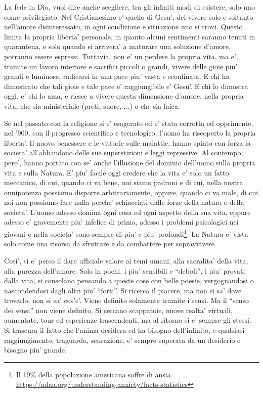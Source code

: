 La fede in Dio, vuol dire anche scegliere, tra gli infiniti modi di esistere, solo uno come privilegiato. Nel Cristianesimo e' quello di Gesu', del vivere solo e soltanto nell'amore disinteressato, in ogni condizione e situazione uno si trovi. Questo limita la propria liberta' personale, in quanto alcuni sentimenti saranno tenuti in quarantena, e solo quando si arrivera' a maturare una soluzione d'amore, potranno essere espressi. Tuttavia, non e' un perdere la propria vita, ma e', tramite un lavoro interiore e sacrifici piccoli o grandi, vivere delle gioie piu' grandi e luminose, radicarsi in una pace piu' vasta e sconfinata. E chi ha dimostrato che tali gioie e tale pace e' raggiungibile e' Gesu'. E chi lo dimostra oggi, e' chi lo ama, e riesce a vivere questa dimensione d'amore, nella propria vita, che sia ministeriale (preti, suore, ...) o che sia laica.

Se nel passato con la religione si e' esagerato ed e' stata corrotta ed opprimente, nel '900, con il progresso scientifico e tecnologico, l'uomo ha riscoperto la propria liberta'. Il nuovo benessere e le vittorie sulle malattie, hanno spinto con forza la societa' all'abbandono delle sue superstizioni e leggi repressive. Al contempo, pero', hanno portato con se' anche l'illusione del dominio dell'uomo sulla propria vita e sulla Natura. E' piu' facile oggi credere che la vita e' solo un fatto meccanico, di cui, quando ci va bene, noi siamo padroni e di cui, nella nostra onnipotenza possiamo disporre arbitrariamente, oppure, quando ci va male, di cui noi non possiamo fare nulla perche' schiacciati dalle forze della natura e della societa'. L'uomo adesso domina ogni cosa ed ogni aspetto della sua vita, eppure adesso e' gravemente piu' infelice di prima, adesso i problemi psicologici nei giovani e nella societa' sono sempre di piu' e piu' profondi\footnote{Il 19\% della popolazione americana soffre di ansia \url{https://adaa.org/understanding-anxiety/facts-statistics}}. La Natura e' vista solo come una risorsa da sfruttare e da combattere per sopravvivere. 

Cosi', si e' perso il dare ufficiale valore ai temi umani, alla sacralita' della vita, alla purezza dell'amore. Solo in pochi, i piu' sensibili e ``deboli'', i piu' provati dalla vita, si consolano pensando a queste cose con belle poesie, vergognandosi o nascondendosi dagli altri piu' ``forti''.
Si ricerca il piacere, ma non si sa' dove trovarlo, non si sa' cos'e'. Viene definito solamente tramite i sensi. Ma il ``senso dei sensi'' non viene definito. Si cercano scappatoie, nuove realta' virtuali, aumentate, tour ed esperienze trascendenti, ma al ritorno si e' sempre gli stessi. Si trascura il fatto che l'anima desidera ed ha bisogno dell'infinito, e qualsiasi raggiungimento, traguardo, sensazione, e' sempre superata da un desiderio e bisogno piu' grande.

